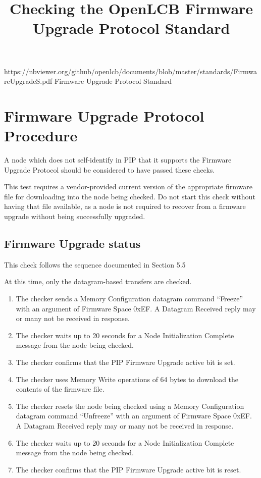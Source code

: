 

\title{Checking the OpenLCB Firmware Upgrade Protocol Standard}


\maketitle


\introductionCaveats
    {https://nbviewer.org/github/openlcb/documents/blob/master/standards/FirmwareUpgradeS.pdf}
    {Firmware Upgrade Protocol Standard}

\section{Firmware Upgrade Protocol Procedure}


A node which does not self-identify in PIP that it supports
the Firmware Upgrade Protocol should be considered to have passed these checks.
\pipsetFootnote

This test requires a vendor-provided current version of the 
appropriate firmware file for downloading into the node being checked.
Do not start this check without having that file available,
as a node is not required to recover from a firmware upgrade without
being successfully upgraded.

\subsection{Firmware Upgrade status}

This check follows the sequence documented in Section 5.5

At this time, only the datagram-based transfers are checked.

\begin{enumerate}
\item The checker sends a Memory Configuration datagram command “Freeze” with an 
    argument of Firmware Space 0xEF. 
    A Datagram Received reply may or many not be received in response.
\item The checker waits up to 20 seconds for a Node Initialization Complete message from the 
    node being checked.
\item The checker confirms that the PIP Firmware Upgrade active bit is set.
\item The checker uses Memory Write operations of 64 bytes to download the contents of the firmware file.
\item The checker resets the node being checked using a Memory Configuration 
    datagram command “Unfreeze” with an argument of Firmware Space 0xEF.    
    A Datagram Received reply may or many not be received in response.
\item The checker waits up to 20 seconds for a Node Initialization Complete message from the 
    node being checked.
\item The checker confirms that the PIP Firmware Upgrade active bit is reset.
\end{enumerate}

  
